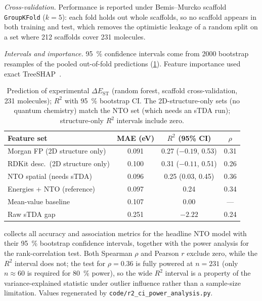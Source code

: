 \documentclass[twoside,twocolumn,9pt]{extarticle}
\begin{document}
\emph{Cross-validation.} Performance is reported under Bemis--Murcko scaffold
\texttt{GroupKFold} ($k=5$): each fold holds out whole scaffolds, so no scaffold
appears in both training and test, which removes the optimistic leakage of a
random split on a set where \num{212} scaffolds cover \num{231} molecules.

\emph{Intervals and importance.} \qty{95}{\percent} confidence intervals come from
\num{2000} bootstrap resamples of the pooled out-of-fold predictions
(\cref{tab:model_metrics}). Feature importance used exact TreeSHAP~\cite{Lundberg2017}.

\begin{table}[htbp]
  \centering
  \caption{Prediction of experimental $\Delta E_\text{ST}$ (random forest,
    scaffold cross-validation, \num{231} molecules); $R^2$ with \qty{95}{\percent}
    bootstrap CI. The 2D-structure-only sets (no quantum chemistry) match the NTO
    set (which needs an sTDA run); structure-only $R^2$ intervals include zero.}
  \label{tab:model_metrics}
  \small
  \begin{tabular}{lccc}
    \toprule
    Feature set & MAE (eV) & $R^2$ (95\% CI) & $\rho$ \\
    \midrule
    Morgan FP (2D structure only)   & 0.091 & 0.27 ($-0.19$, 0.53) & 0.31 \\
    RDKit desc.\ (2D structure only) & 0.100 & 0.31 ($-0.11$, 0.51) & 0.26 \\
    NTO spatial (needs sTDA)        & 0.096 & 0.25 (0.03, 0.45) & 0.36 \\
    Energies + NTO (reference)      & 0.097 & 0.24 & 0.34 \\
    Mean-value baseline             & 0.107 & 0.00 & --- \\
    Raw sTDA gap                    & 0.251 & $-2.22$ & 0.24 \\
    \bottomrule
  \end{tabular}
\end{table}

 collects all accuracy and association metrics for the
headline NTO model with their \qty{95}{\percent} bootstrap confidence intervals,
together with the power analysis for the rank-correlation test. Both Spearman
$\rho$ and Pearson $r$ exclude zero, while the $R^2$ interval does not; the
test for $\rho = 0.36$ is fully powered at $n = 231$ (only $n \approx 60$ is
required for \qty{80}{\percent} power), so the wide $R^2$ interval is a property
of the variance-explained statistic under outlier influence rather than a
sample-size limitation. Values regenerated by
\texttt{code/r2\_ci\_power\_analysis.py}.
\end{document}
